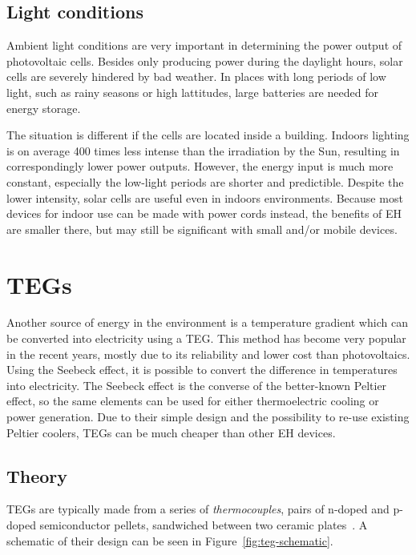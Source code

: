 \documentclass[a4paper,10pt]{article}
\begin{document}
\subsection{Light conditions}

Ambient light conditions are very important in determining the power output of photovoltaic cells. Besides only producing power during the daylight hours, solar cells are severely hindered by bad weather. In places with long periods of low light, such as rainy seasons or high lattitudes, large batteries are needed for energy storage. 

The situation is different if the cells are located inside a building. Indoors lighting is on average 400 times less intense than the irradiation by the Sun, resulting in correspondingly lower power outputs. However, the energy input is much more constant, especially the low-light periods are shorter and predictible. Despite the lower intensity, solar cells are useful even in indoors environments. Because most devices for indoor use can be made with power cords instead, the benefits of \ac{EH} are smaller there, but may still be significant with small and/or mobile devices. 

\section{\aclp{TEG}}


Another source of energy in the environment is a temperature gradient which can be converted into electricity using a \ac{TEG}. This method has become very popular in the recent years, mostly due to its reliability and lower cost than photovoltaics. Using the Seebeck effect, it is possible to convert the difference in temperatures into electricity.  The Seebeck effect is the converse of the better-known Peltier effect, so the same elements can be used for either thermoelectric cooling or power generation. Due to their simple design and the possibility to re-use existing Peltier coolers, \acp{TEG} can be much cheaper than other \ac{EH} devices. 

\subsection{Theory}

\acp{TEG} are typically made from a series of \textit{thermocouples}, pairs of n-doped and p-doped semiconductor pellets, sandwiched between two ceramic plates~\cite{Salerno10}. A schematic of their design can be seen in Figure~\ref{fig:teg-schematic}. 
\end{document}
